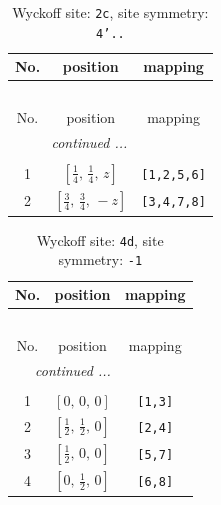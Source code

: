 \documentclass[fleqn,8pt]{jsarticle}
\begin{document}
\renewcommand{\arraystretch}{1.2}
\begin{longtable}{ccc}
\caption{Wyckoff site: {\tt 2c}, site symmetry: {\tt 4'..}}
 \\
 \hline \hline
No. & position & mapping \\ \hline \endfirsthead

\multicolumn{2}{l}{\tablename\ \thetable{}} \\
 \hline \hline
No. & position & mapping \\ \hline \endhead

 \hline \hline
\multicolumn{2}{r}{\footnotesize\it continued ...} \\ \endfoot

 \hline \hline
\multicolumn{2}{r}{} \\ \endlastfoot

1 & $\left[ \frac{1}{4},\, \frac{1}{4},\, z \right]$ & {\tt [1,2,5,6]} \\ \hline
2 & $\left[ \frac{3}{4},\, \frac{3}{4},\, - z \right]$ & {\tt [3,4,7,8]} \\
\end{longtable}
\renewcommand{\arraystretch}{1.2}
\begin{longtable}{ccc}
\caption{Wyckoff site: {\tt 4d}, site symmetry: {\tt -1}}
 \\
 \hline \hline
No. & position & mapping \\ \hline \endfirsthead

\multicolumn{2}{l}{\tablename\ \thetable{}} \\
 \hline \hline
No. & position & mapping \\ \hline \endhead

 \hline \hline
\multicolumn{2}{r}{\footnotesize\it continued ...} \\ \endfoot

 \hline \hline
\multicolumn{2}{r}{} \\ \endlastfoot

1 & $\left[ 0,\, 0,\, 0 \right]$ & {\tt [1,3]} \\ \hline
2 & $\left[ \frac{1}{2},\, \frac{1}{2},\, 0 \right]$ & {\tt [2,4]} \\ \hline
3 & $\left[ \frac{1}{2},\, 0,\, 0 \right]$ & {\tt [5,7]} \\ \hline
4 & $\left[ 0,\, \frac{1}{2},\, 0 \right]$ & {\tt [6,8]} \\
\end{longtable}
\renewcommand{\arraystretch}{1.2}
\end{document}
